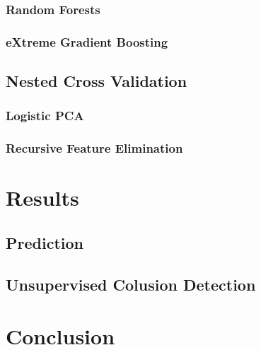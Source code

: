 \documentclass[a4paper,12pt, headsepline]{scrartcl}
\numberwithin{equation}{section}
\begin{document}
		\subsubsection{Random Forests}\label{subsubsec:rf}
		\subsubsection{eXtreme Gradient Boosting}\label{subsubsec:xgb}
	\subsection{Nested Cross Validation}\label{subsec:nest}
		\subsubsection{Logistic PCA}\label{subsubsec:logp}
		\subsubsection{Recursive Feature Elimination}\label{subsubsec:rfe}
\section{Results}\label{sec:res}
	\subsection{Prediction}\label{subsec:pred}
	\subsection{Unsupervised Colusion Detection}\label{subsec:col}
\section{Conclusion}\label{sec:con}
 
\newpage
\printbibliography
\end{document}
